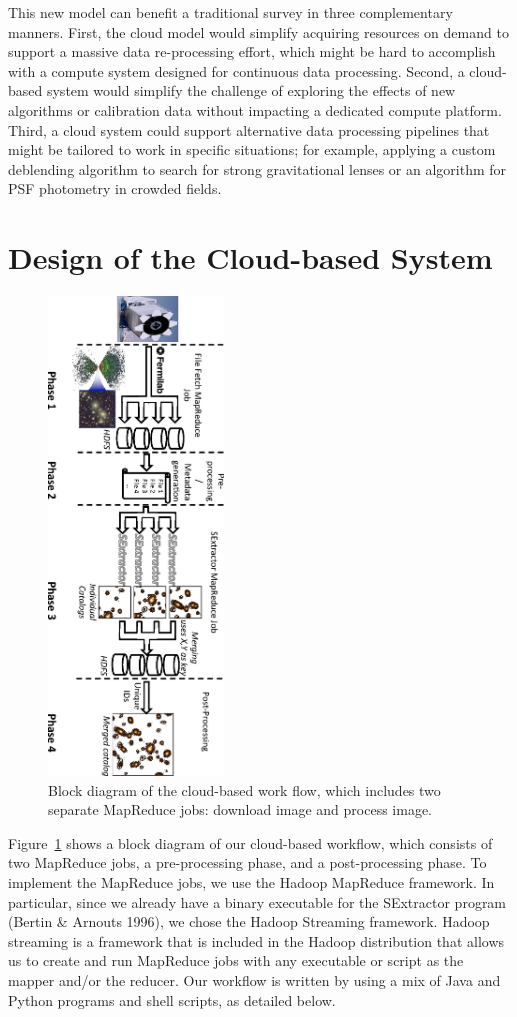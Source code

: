 This new model can benefit a traditional survey in three complementary manners. 
First, the cloud model would simplify acquiring resources on demand to support a massive data re-processing effort, which might be hard to accomplish with a compute system designed for continuous data processing. 
Second, a cloud-based system would simplify the challenge of exploring the effects of new algorithms or calibration data without impacting a dedicated compute platform. 
Third, a cloud system could support alternative data processing pipelines that might be tailored to work in specific situations; for example, applying a custom deblending algorithm to search for strong gravitational lenses or an algorithm for PSF photometry in crowded fields. 

\section{Design of the Cloud-based System}

\begin{figure}[t!]
	\centering
	\includegraphics[height=5.0in, angle=90]{part4/Farivar_O12/Diagram.eps}
	\caption{Block diagram of the cloud-based work flow, which includes two separate MapReduce jobs: download image  and  process image.}
	\label{bdiagram}
\end{figure}


Figure~\ref{bdiagram} shows a block diagram of our cloud-based workflow, which consists of two MapReduce jobs, a pre-processing phase, and a post-processing phase.
To implement the MapReduce jobs, we use the Hadoop MapReduce framework. In particular, since we already have a binary executable for the SExtractor program (Bertin \& Arnouts 1996), we chose the Hadoop Streaming framework. 
Hadoop streaming is a framework that is included in the Hadoop distribution that allows us to create and run MapReduce jobs with any executable or script as the mapper and/or the reducer. Our workflow is written by using a mix of Java and Python programs and shell scripts, as detailed below.


